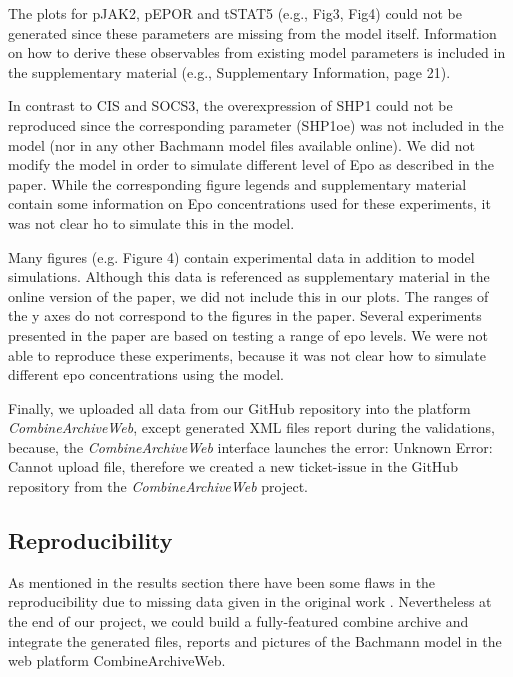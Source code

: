The plots for pJAK2, pEPOR and tSTAT5 (e.g., Fig3, Fig4) could not be generated since these parameters are missing from the model itself. Information on how to derive these observables from existing model parameters is included in the supplementary material (e.g., Supplementary Information, page 21). 

In contrast to CIS and SOCS3, the overexpression of SHP1 could not be reproduced since the corresponding parameter (SHP1oe) was not included in the model (nor in any other Bachmann model files available online). We did not modify the model in order to simulate different level of Epo as described in the paper. While the corresponding figure legends and supplementary material contain some information on Epo concentrations used for these experiments, it was not clear ho to simulate this in the model.

Many figures (e.g. Figure 4) contain experimental data in addition to model simulations. Although this data is referenced as supplementary material in the online version of the paper, we did not include this in our plots. The ranges of the y axes do not correspond to the figures in the paper. 
Several experiments presented in the paper are based on testing a range of \ac{epo} levels. We were not able to reproduce these experiments, because it was not clear how to simulate different \ac{epo} concentrations using the model.

Finally, we uploaded all data from our GitHub repository into the platform \textit{CombineArchiveWeb}, except generated XML files report during the validations, because, the \textit{CombineArchiveWeb} interface launches the error: \textsf{Unknown Error: Cannot upload file}, therefore we created a new ticket-issue in the GitHub repository from the \textit{CombineArchiveWeb} project.

\subsection*{Reproducibility}
As mentioned in the results section there have been some flaws in the reproducibility due to missing data given in the original work \cite{bachmannmodel}. Nevertheless at the end of our project, we could build a fully-featured \ac{combine} archive and integrate the generated files, reports and pictures of the Bachmann model in the web platform CombineArchiveWeb.